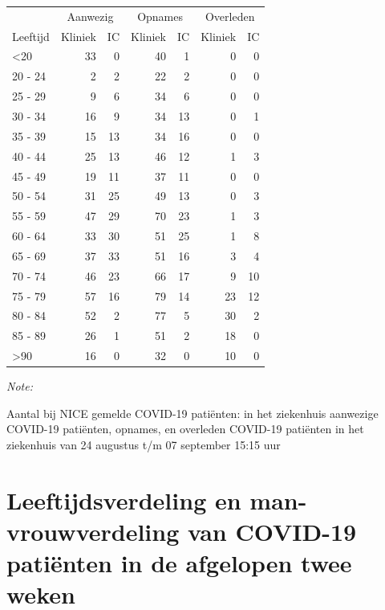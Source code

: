 \documentclass[
  english,
  man,floatsintext]{apa6}
\begin{document}
\begin{table}
\centering\begingroup\fontsize{10}{12}\selectfont

\begin{threeparttable}
\begin{tabular}{lrrrrrr}
\toprule
\multicolumn{1}{c}{ } & \multicolumn{2}{c}{Aanwezig} & \multicolumn{2}{c}{Opnames} & \multicolumn{2}{c}{Overleden} \\
\cmidrule(l{3pt}r{3pt}){2-3} \cmidrule(l{3pt}r{3pt}){4-5} \cmidrule(l{3pt}r{3pt}){6-7}
Leeftijd & Kliniek & IC & Kliniek & IC & Kliniek & IC\\
\midrule
<20 & 33 & 0 & 40 & 1 & 0 & 0\\
20 - 24 & 2 & 2 & 22 & 2 & 0 & 0\\
25 - 29 & 9 & 6 & 34 & 6 & 0 & 0\\
30 - 34 & 16 & 9 & 34 & 13 & 0 & 1\\
35 - 39 & 15 & 13 & 34 & 16 & 0 & 0\\
40 - 44 & 25 & 13 & 46 & 12 & 1 & 3\\
45 - 49 & 19 & 11 & 37 & 11 & 0 & 0\\
50 - 54 & 31 & 25 & 49 & 13 & 0 & 3\\
55 - 59 & 47 & 29 & 70 & 23 & 1 & 3\\
60 - 64 & 33 & 30 & 51 & 25 & 1 & 8\\
65 - 69 & 37 & 33 & 51 & 16 & 3 & 4\\
70 - 74 & 46 & 23 & 66 & 17 & 9 & 10\\
75 - 79 & 57 & 16 & 79 & 14 & 23 & 12\\
80 - 84 & 52 & 2 & 77 & 5 & 30 & 2\\
85 - 89 & 26 & 1 & 51 & 2 & 18 & 0\\
>90 & 16 & 0 & 32 & 0 & 10 & 0\\
\bottomrule
\end{tabular}
\begin{tablenotes}
\item \textit{Note: } 
\item Aantal bij NICE gemelde COVID-19 patiënten: in het ziekenhuis aanwezige COVID-19 patiënten, opnames, en overleden COVID-19 patiënten in het ziekenhuis van 24 augustus t/m 07 september 15:15 uur
\end{tablenotes}
\end{threeparttable}
\endgroup{}
\end{table}

\newpage

\hypertarget{leeftijdsverdeling-en-man-vrouwverdeling-van-covid-19-patiuxebnten-in-de-afgelopen-twee-weken}{%
\section{Leeftijdsverdeling en man-vrouwverdeling van COVID-19 patiënten in de afgelopen twee weken}\label{leeftijdsverdeling-en-man-vrouwverdeling-van-covid-19-patiuxebnten-in-de-afgelopen-twee-weken}}
\end{document}
